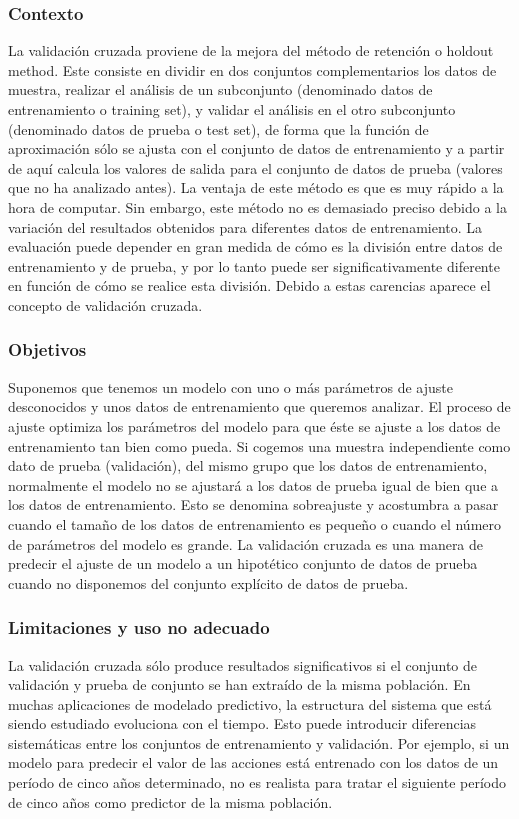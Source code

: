 \documentclass[10pt,a4paper]{article}
\begin{document}
\subsubsection{Contexto}
La validación cruzada proviene de la mejora del método de retención o holdout method. Este consiste en dividir en dos conjuntos complementarios los datos de muestra, realizar el análisis de un subconjunto (denominado datos de entrenamiento o training set), y validar el análisis en el otro subconjunto (denominado datos de prueba o test set), de forma que la función de aproximación sólo se ajusta con el conjunto de datos de entrenamiento y a partir de aquí calcula los valores de salida para el conjunto de datos de prueba (valores que no ha analizado antes). La ventaja de este método es que es muy rápido a la hora de computar. Sin embargo, este método no es demasiado preciso debido a la variación del resultados obtenidos para diferentes datos de entrenamiento. La evaluación puede depender en gran medida de cómo es la división entre datos de entrenamiento y de prueba, y por lo tanto puede ser significativamente diferente en función de cómo se realice esta división. Debido a estas carencias aparece el concepto de validación cruzada.

\subsubsection{Objetivos}
Suponemos que tenemos un modelo con uno o más parámetros de ajuste desconocidos y unos datos de entrenamiento que queremos analizar. El proceso de ajuste optimiza los parámetros del modelo para que éste se ajuste a los datos de entrenamiento tan bien como pueda. Si cogemos una muestra independiente como dato de prueba (validación), del mismo grupo que los datos de entrenamiento, normalmente el modelo no se ajustará a los datos de prueba igual de bien que a los datos de entrenamiento. Esto se denomina sobreajuste y acostumbra a pasar cuando el tamaño de los datos de entrenamiento es pequeño o cuando el número de parámetros del modelo es grande. La validación cruzada es una manera de predecir el ajuste de un modelo a un hipotético conjunto de datos de prueba cuando no disponemos del conjunto explícito de datos de prueba.

\subsubsection{Limitaciones y uso no adecuado}
La validación cruzada sólo produce resultados significativos si el conjunto de validación y prueba de conjunto se han extraído de la misma población. En muchas aplicaciones de modelado predictivo, la estructura del sistema que está siendo estudiado evoluciona con el tiempo. Esto puede introducir diferencias sistemáticas entre los conjuntos de entrenamiento y validación. Por ejemplo, si un modelo para predecir el valor de las acciones está entrenado con los datos de un período de cinco años determinado, no es realista para tratar el siguiente período de cinco años como predictor de la misma población.
\end{document}
